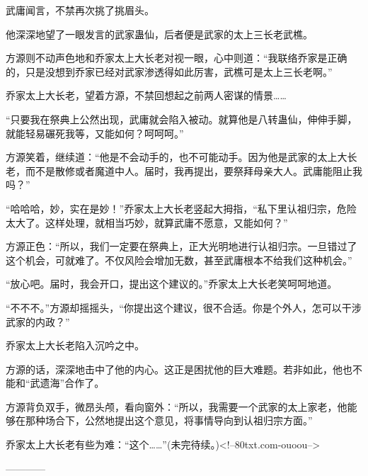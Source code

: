 \begin{this_body}
武庸闻言，不禁再次挑了挑眉头。

他深深地望了一眼发言的武家蛊仙，后者便是武家的太上三长老武樵。

方源则不动声色地和乔家太上大长老对视一眼，心中则道：“我联络乔家是正确的，只是没想到乔家已经对武家渗透得如此厉害，武樵可是太上三长老啊。”

乔家太上大长老，望着方源，不禁回想起之前两人密谋的情景……

“只要我在祭典上公然出现，武庸就会陷入被动。就算他是八转蛊仙，伸伸手脚，就能轻易碾死我等，又能如何？呵呵呵。”

方源笑着，继续道：“他是不会动手的，也不可能动手。因为他是武家的太上大长老，而不是散修或者魔道中人。届时，我再提出，要祭拜母亲大人。武庸能阻止我吗？”

“哈哈哈，妙，实在是妙！”乔家太上大长老竖起大拇指，“私下里认祖归宗，危险太大了。这样处理，就相当巧妙，就算武庸不愿意，又能如何？”

方源正色：“所以，我们一定要在祭典上，正大光明地进行认祖归宗。一旦错过了这个机会，可就难了。不仅风险会增加无数，甚至武庸根本不给我们这种机会。”

“放心吧。届时，我会开口，提出这个建议的。”乔家太上大长老笑呵呵地道。

“不不不。”方源却摇摇头，“你提出这个建议，很不合适。你是个外人，怎可以干涉武家的内政？”

乔家太上大长老陷入沉吟之中。

方源的话，深深地击中了他的内心。这正是困扰他的巨大难题。若非如此，他也不能和“武遗海”合作了。

方源背负双手，微昂头颅，看向窗外：“所以，我需要一个武家的太上家老，他能够在那种场合下，公然地提出这个意见，将事情导向到认祖归宗方面。”

乔家太上大长老有些为难：“这个……”(未完待续。)<!--80txt.com-ouoou-->

------------

\end{this_body}

